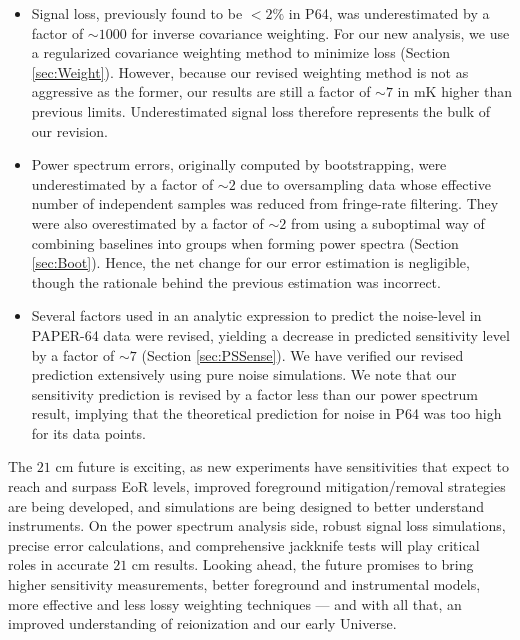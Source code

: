 \documentclass[preprint2,numberedappendix,tighten]{aastex6}  %
\begin{document}
\begin{itemize}
\item Signal loss, previously found to be $<2\%$ in P64, was underestimated by a factor of $\sim$$1000$ for inverse covariance weighting. For our new analysis, we use a regularized covariance weighting method to minimize loss (Section \ref{sec:Weight}). However, because our revised weighting method is not as aggressive as the former, our results are still a factor of $\sim7$ in mK higher than previous limits. Underestimated signal loss therefore represents the bulk of our revision.
\item Power spectrum errors, originally computed by bootstrapping, were underestimated by a factor of $\sim$$2$ due to oversampling data whose effective number of independent samples was reduced from fringe-rate filtering. They were also overestimated by a factor of $\sim$$2$ from using a suboptimal way of combining baselines into groups when forming power spectra (Section \ref{sec:Boot}). Hence, the net change for our error estimation is negligible, though the rationale behind the previous estimation was incorrect.
\item Several factors used in an analytic expression to predict the noise-level in PAPER-64 data were revised, yielding a decrease in predicted sensitivity level by a factor of $\sim$$7$ (Section \ref{sec:PSSense}). We have verified our revised prediction extensively using pure noise simulations. We note that our sensitivity prediction is revised by a factor less than our power spectrum result, implying that the theoretical prediction for noise in P64 was too high for its data points.
\end{itemize}

The $21$ cm future is exciting, as new experiments have sensitivities that expect to reach and surpass EoR levels, improved foreground mitigation/removal strategies are being developed, and simulations are being designed to better understand instruments. On the power spectrum analysis side, robust signal loss simulations, precise error calculations, and comprehensive jackknife tests will play critical roles in accurate $21$ cm results. Looking ahead, the future promises to bring higher sensitivity measurements, better foreground and instrumental models, more effective and less lossy weighting techniques --- and with all that, an improved understanding of reionization and our early Universe.

\end{document}
